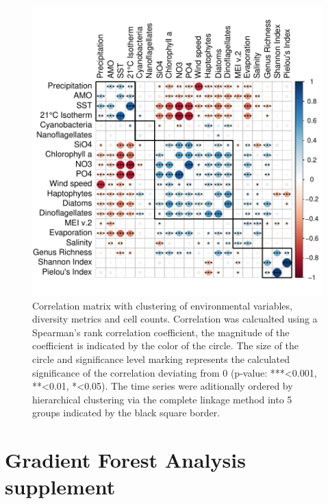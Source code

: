 \documentclass[draft]{agujournal2019}
\begin{document}
\begin{figure}
\noindent\includegraphics[width=\textwidth]{fig/CorrClustSupplementalPlot_v1.pdf}
\caption{Correlation matrix with clustering of environmental variables, diversity metrics and cell counts. Correlation was calcualted using a Spearman's rank correlation coefficient, the magnitude of the coefficient is indicated by the color of the circle. The size of the circle and significance level marking represents the calculated significance of the correlation deviating from 0 (p-value: ***\textless0.001, **\textless0.01, *\textless0.05). The time series were aditionally ordered by hierarchical clustering via the complete linkage method into 5 groups indicated by the black square border.}
\label{fig:sup:correlation}
\end{figure}



\section{Gradient Forest Analysis supplement}
\end{document}
